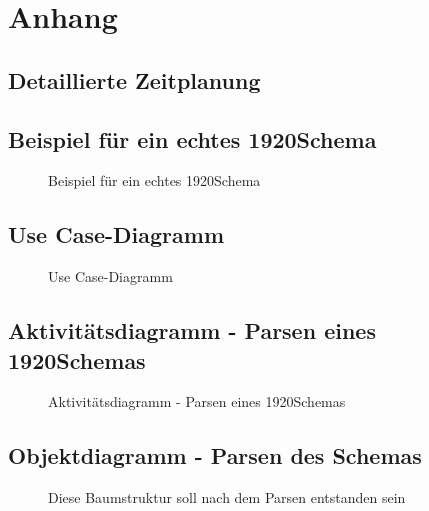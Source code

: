 \section{Anhang}
\subsection{Detaillierte Zeitplanung}
\label{app:Zeitplanung}


\clearpage
\subsection{Beispiel für ein echtes 1920Schema}
\label{app:RealSchema}
\begin{figure}[htb]
\centering
{}
\caption{Beispiel für ein echtes 1920Schema}
\end{figure}
\clearpage
\subsection{Use Case-Diagramm}
\label{app:UseCase}
\begin{figure}[htb]
\centering
{}
\caption{Use Case-Diagramm}
\end{figure}
\clearpage


\clearpage

\subsection{Aktivitätsdiagramm - Parsen eines 1920Schemas}
\label{app:AktivitaetsdiagrammSchemaParsen}
\begin{figure}[htb]
\centering
{}
\caption{Aktivitätsdiagramm - Parsen eines 1920Schemas}
\end{figure}
\clearpage


\subsection{Objektdiagramm - Parsen des Schemas}
\label{app:ObjDiagramsdiagrammSchemaParsen}
\begin{figure}[htb]
\centering
{}
\caption{Diese Baumstruktur soll nach dem Parsen entstanden sein}
\end{figure}
\clearpage




